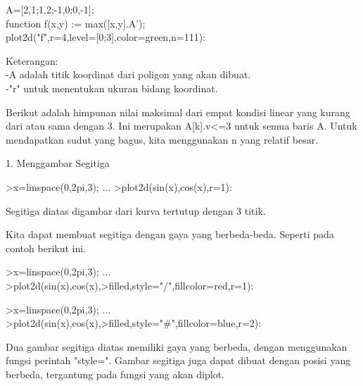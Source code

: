 \documentclass[a4paper,10pt]{article}
\begin{document}
\begin{eulernotebook}
\begin{eulercomment}
\begin{eulercomment}
\begin{eulercomment}
\begin{eulercomment}
\begin{eulercomment}
\begin{eulercomment}
\begin{eulercomment}
\begin{eulercomment}
\begin{eulercomment}
A=[2,1;1,2;-1,0;0,-1];\\
function f(x,y) := max([x,y].A');\\
plot2d("f",r=4,level=[0;3],color=green,n=111):

Keterangan:\\
-A adalah titik koordinat dari poligon yang akan dibuat.\\
-"r" untuk menentukan ukuran bidang koordinat.

Berikut adalah himpunan nilai maksimal dari empat kondisi linear yang
kurang dari atau sama dengan 3. Ini merupakan A[k].v\textless{}=3 untuk semua
baris A. Untuk mendapatkan sudut yang bagus, kita menggunakan n yang
relatif besar.


1. Menggambar Segitiga
\end{eulercomment}
\begin{eulerprompt}
>x=linspace(0,2pi,3); ...
>plot2d(sin(x),cos(x),r=1):
\end{eulerprompt}
\begin{eulercomment}
Segitiga diatas digambar dari kurva tertutup dengan 3 titik.

Kita dapat membuat segitiga dengan gaya yang berbeda-beda. Seperti
pada contoh berikut ini.
\end{eulercomment}
\begin{eulerprompt}
>x=linspace(0,2pi,3); ...
>plot2d(sin(x),cos(x),>filled,style="/",fillcolor=red,r=1):
\end{eulerprompt}
\begin{eulerprompt}
>x=linspace(0,2pi,3); ...
>plot2d(sin(x),cos(x),>filled,style="#",fillcolor=blue,r=2):
\end{eulerprompt}
\begin{eulercomment}
Dua gambar segitiga diatas memiliki gaya yang berbeda, dengan
menggunakan fungsi perintah "style=". Gambar segitiga juga dapat
dibuat dengan posisi yang berbeda, tergantung pada fungsi yang akan
diplot.



\end{eulercomment}
\end{eulercomment}
\end{eulercomment}
\end{eulercomment}
\end{eulercomment}
\end{eulercomment}
\end{eulercomment}
\end{eulercomment}
\end{eulercomment}
\end{eulernotebook}
\end{document}
